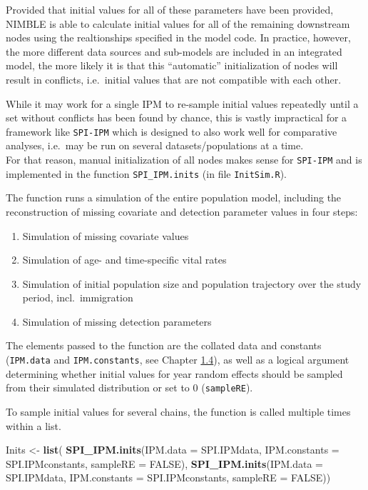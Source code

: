 \documentclass[
]{book}
\newenvironment{Shaded}{\begin{snugshade}}{\end{snugshade}}
\newcommand{\DataTypeTok}[1]{\textcolor[rgb]{0.13,0.29,0.53}{#1}}
\newcommand{\KeywordTok}[1]{\textcolor[rgb]{0.13,0.29,0.53}{\textbf{#1}}}
\newcommand{\NormalTok}[1]{#1}
\newcommand{\OtherTok}[1]{\textcolor[rgb]{0.56,0.35,0.01}{#1}}
\newcommand{\StringTok}[1]{\textcolor[rgb]{0.31,0.60,0.02}{#1}}
\providecommand{\tightlist}{%
  \setlength{\itemsep}{0pt}\setlength{\parskip}{0pt}}
\begin{document}
Provided that initial values for all of these parameters have been provided,
NIMBLE is able to calculate initial values for all of the remaining downstream
nodes using the realtionships specified in the model code. In practice, however,
the more different data sources and sub-models are included in an integrated
model, the more likely it is that this ``automatic'' initialization of nodes will
result in conflicts, i.e.~initial values that are not compatible with each other.

While it may work for a single IPM to re-sample initial values repeatedly until
a set without conflicts has been found by chance, this is vastly impractical for
a framework like \texttt{SPI-IPM} which is designed to also work well for comparative
analyses, i.e.~may be run on several datasets/populations at a time.\\
For that reason, manual initialization of all nodes makes sense for \texttt{SPI-IPM} and
is implemented in the function \texttt{SPI\_IPM.inits} (in file \texttt{InitSim.R}).

The function runs a simulation of the entire population model, including the
reconstruction of missing covariate and detection parameter values in four
steps:

\begin{enumerate}
\def\labelenumi{\arabic{enumi}.}
\tightlist
\item
  Simulation of missing covariate values
\item
  Simulation of age- and time-specific vital rates
\item
  Simulation of initial population size and population trajectory over the study period, incl.~immigration
\item
  Simulation of missing detection parameters
\end{enumerate}

The elements passed to the function are the collated data and constants
(\texttt{IPM.data} and \texttt{IPM.constants}, see Chapter \protect\hyperlink{ux5cux23ux5cux2520Organisationux5cux2520forux5cux2520analysisux5cux2520withux5cux2520NIMBLE}{1.4}),
as well as a logical argument determining whether initial values for year random
effects should be sampled from their simulated distribution or set to 0 (\texttt{sampleRE}).

To sample initial values for several chains, the function is called multiple
times within a list.

\begin{Shaded}
\begin{Highlighting}[]
\NormalTok{Inits <-}\StringTok{ }\KeywordTok{list}\NormalTok{(}
  \KeywordTok{SPI_IPM.inits}\NormalTok{(}\DataTypeTok{IPM.data =}\NormalTok{ SPI.IPMdata, }\DataTypeTok{IPM.constants =}\NormalTok{ SPI.IPMconstants, }\DataTypeTok{sampleRE =} \OtherTok{FALSE}\NormalTok{),}
  \KeywordTok{SPI_IPM.inits}\NormalTok{(}\DataTypeTok{IPM.data =}\NormalTok{ SPI.IPMdata, }\DataTypeTok{IPM.constants =}\NormalTok{ SPI.IPMconstants, }\DataTypeTok{sampleRE =} \OtherTok{FALSE}\NormalTok{))}
\end{Highlighting}
\end{Shaded}
\end{document}
